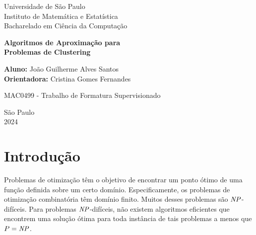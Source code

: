 \documentclass[12pt]{article}
\begin{document}
\begin{center}
{\large Universidade de São Paulo\\
Instituto de Matemática e Estatística\\
Bacharelado em Ciência da Computação}
    \vspace*{7cm}


{\Large {\bf Algoritmos de Aproximação para \\Problemas de Clustering}
}

\vspace{0.2cm}
{\small 
{\bf Aluno:} João Guilherme Alves Santos\\
{\bf Orientadora:} Cristina Gomes Fernandes
}
\vspace{3cm} 

{MAC0499 - Trabalho de Formatura Supervisionado}
\vspace{5cm}

{\small
São Paulo \\
2024
}
\end{center}


    
    
    
    


\newpage

\tableofcontents
\newpage

\section{Introdução}

Problemas de otimização têm o objetivo de encontrar um ponto ótimo de uma função definida sobre um certo domínio. Especificamente, os problemas de otimização combinatória têm domínio finito. Muitos desses problemas são $\mathit{NP}$-difíceis. Para problemas $\mathit{NP}$-difíceis, não existem algoritmos eficientes que encontrem uma solução ótima para toda instância de tais problemas a menos que $P = \mathit{NP}$.
\end{document}
